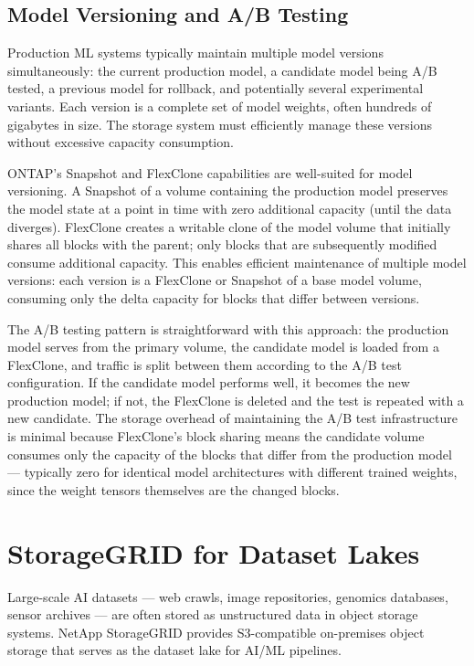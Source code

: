 \subsection{Model Versioning and A/B Testing}

Production ML systems typically maintain multiple model versions
simultaneously: the current production model, a candidate model being A/B
tested, a previous model for rollback, and potentially several experimental
variants. Each version is a complete set of model weights, often hundreds of
gigabytes in size. The storage system must efficiently manage these versions
without excessive capacity consumption.

ONTAP's Snapshot and FlexClone capabilities are well-suited for model
versioning. A Snapshot of a volume containing the production model preserves
the model state at a point in time with zero additional capacity (until the
data diverges). FlexClone creates a writable clone of the model volume that
initially shares all blocks with the parent; only blocks that are subsequently
modified consume additional capacity. This enables efficient maintenance of
multiple model versions: each version is a FlexClone or Snapshot of a base
model volume, consuming only the delta capacity for blocks that differ between
versions.

The A/B testing pattern is straightforward with this approach: the production
model serves from the primary volume, the candidate model is loaded from a
FlexClone, and traffic is split between them according to the A/B test
configuration. If the candidate model performs well, it becomes the new
production model; if not, the FlexClone is deleted and the test is repeated
with a new candidate. The storage overhead of maintaining the A/B test
infrastructure is minimal because FlexClone's block sharing means the
candidate volume consumes only the capacity of the blocks that differ from the
production model --- typically zero for identical model architectures with
different trained weights, since the weight tensors themselves are the changed
blocks.

\section{StorageGRID for Dataset Lakes}

Large-scale AI datasets --- web crawls, image repositories, genomics
databases, sensor archives --- are often stored as unstructured data in object
storage systems. NetApp StorageGRID provides S3-compatible on-premises object
storage that serves as the dataset lake for AI/ML pipelines.

